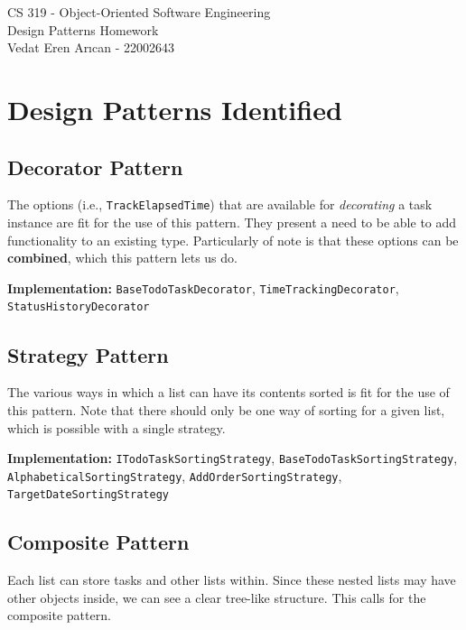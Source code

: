 \documentclass[a4paper, 12pt, titlepage]{article}
\begin{document}
  \begin{center}
    {\Large CS 319 - Object-Oriented Software Engineering}\\
    {\vspace{1.5em}\large Design Patterns Homework}\\
    {Vedat Eren Arıcan - 22002643}
  \end{center}
  
  \section{Design Patterns Identified}
  
  \subsection{Decorator Pattern}
  
  The options (i.e., \texttt{TrackElapsedTime}) that are available for \textit{decorating} a task instance are fit for the use of this pattern.
  They present a need to be able to add functionality to an existing type.
  Particularly of note is that these options can be \textbf{combined}, which this pattern lets us do.
  
  \textbf{Implementation:} \texttt{BaseTodoTaskDecorator}, \texttt{TimeTrackingDecorator},\\ \texttt{StatusHistoryDecorator}
  
  \subsection{Strategy Pattern}
  
  The various ways in which a list can have its contents sorted is fit for the use of this pattern.
  Note that there should only be one way of sorting for a given list, which is possible with a single strategy.
  
  \textbf{Implementation:} \texttt{ITodoTaskSortingStrategy}, \texttt{BaseTodoTaskSortingStrategy},\\
  \texttt{AlphabeticalSortingStrategy}, \texttt{AddOrderSortingStrategy},\\ \texttt{TargetDateSortingStrategy}
  
  \subsection{Composite Pattern}
  
  Each list can store tasks and other lists within. Since these nested lists may have other objects inside,
  we can see a clear tree-like structure. This calls for the composite pattern.
  
\end{document}
